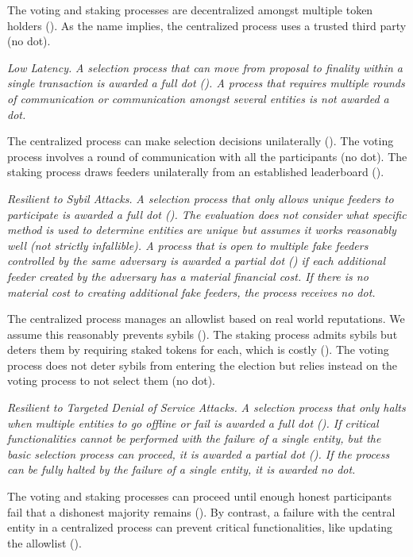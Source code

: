The voting and staking processes are decentralized amongst multiple token holders (\full). As the name implies, the centralized process uses a trusted third party (no dot).

\emph{Low Latency.} \textit{A selection process that can move from proposal to finality within a single transaction is awarded a full dot (\full). A process that requires multiple rounds of communication or communication amongst several entities is not awarded a dot.}

The centralized process can make selection decisions unilaterally (\full). The voting process involves a round of communication with all the participants (no dot). The staking process draws feeders unilaterally from an established leaderboard (\full). 

\emph{Resilient to Sybil Attacks.} \textit{A selection process that only allows unique feeders to participate is awarded a full dot (\full). The evaluation does not consider what specific method is used to determine entities are unique but assumes it works reasonably well (not strictly infallible). A process that is open to multiple fake feeders controlled by the same adversary is awarded a partial dot (\prt) if each additional feeder created by the adversary has a material financial cost. If there is no material cost to creating additional fake feeders, the process receives no dot.}

The centralized process manages an allowlist based on real world reputations. We assume this reasonably prevents sybils (\full). The staking process admits sybils but deters them by requiring staked tokens for each, which is costly (\prt). The voting process does not deter sybils from entering the election but relies instead on the voting process to not select them (no dot).   

\emph{Resilient to Targeted Denial of Service Attacks.} \textit{A selection process that only halts when multiple entities to go offline or fail is awarded a full dot (\full). If critical functionalities cannot be performed with the failure of a single entity, but the basic selection process can proceed, it is awarded a partial dot (\prt). If the process can be fully halted by the failure of a single entity, it is awarded no dot.}

The voting and staking processes can proceed until enough honest participants fail that a dishonest majority remains (\full). By contrast, a failure with the central entity in a centralized process can prevent critical functionalities, like updating the allowlist (\prt).

